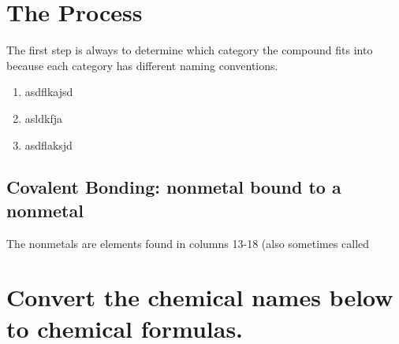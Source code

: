 \documentclass[12pt, oneside, letterpaper]{book}
\begin{document}
%
\pagestyle{fancy} %
\renewcommand{\headrulewidth}{0pt}
\fancyhead{}
\fancyhead[R]{\thepage}
\fancyfoot{} %
\renewcommand{\footrulewidth}{0.1pt}
%
%
%
\section{The Process}

The first step is always to determine which category the compound fits into because each category has different naming conventions. 

\begin{enumerate}
    \item asdflkajsd
    \item asldkfja
    \item asdflaksjd
\end{enumerate}

\subsection{ Covalent Bonding: nonmetal bound to a nonmetal}

The nonmetals are elements found in columns 13-18 (also sometimes called 

\newpage

\section{ Convert the chemical names below to chemical formulas.} 


\vspace{20mm}
\end{document}

